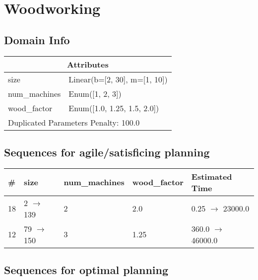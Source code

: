 \documentclass{article}
\begin{document}
                            \newpage \section{Woodworking}
                    \subsection*{Domain Info}

                    \begin{center}
                    \begin{tabular}{@{}p{}p{}@{}}
                    \multicolumn{2}{c}{\bf \large Attributes}\\\midrule
                    size & Linear(b=[2, 30], m=[1, 10])\\
num\_machines & Enum([1, 2, 3])\\
wood\_factor & Enum([1.0, 1.25, 1.5, 2.0])
                    
                     \\\midrule
                    \multicolumn{2}{l}{Duplicated Parameters Penalty: 100.0}
                    \end{tabular}
                    \end{center}
                
                         \subsection*{Sequences for agile/satisficing planning}

                        \begin{center}
                        \begin{tabular}{@{}l|l|l|l|l@{}}
                        \# & size & num\_machines & wood\_factor & Estimated Time\\\midrule
                        18&2 $\rightarrow$ 139&2&2.0&0.25 $\rightarrow$ 23000.0\\
12&79 $\rightarrow$ 150&3&1.25&360.0 $\rightarrow$ 46000.0
                        \end{tabular}
                        \end{center}
                    
                            \subsection*{Sequences for optimal planning}
\end{document}
